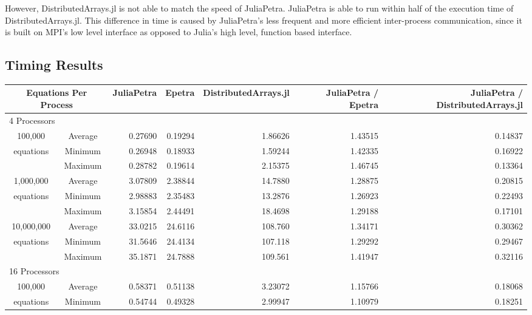 \documentclass[acmsmall]{acmart}
\begin{document}
However, DistributedArrays.jl is not able to match the speed of JuliaPetra.
JuliaPetra is able to run within half of the execution time of DistributedArrays.jl.
This difference in time is caused by JuliaPetra's less frequent and more efficient inter-process communication,
since it is built on MPI's low level interface as opposed to Julia's high level, function based interface.

\subsection{Timing Results}

\begin{table}
	\begin{tabular}{|c c|r|r|r||r|r|}
		\hline
			\multicolumn{2}{|c|}{Equations Per Process}
			& JuliaPetra
			& Epetra
			& \multicolumn{1}{m{1.8cm}||}{Distributed\-Arrays.jl}
			& \multicolumn{1}{m{1.75cm}|}{JuliaPetra / Epetra}
			& \multicolumn{1}{m{1.8cm}|}{JuliaPetra / Distributed\-Arrays.jl} \\
		\hline
			\multicolumn{7}{|l|}{4 Processors}\\
		\hline
			100,000			&Average & 0.27690 & 0.19294 & 1.86626 & 1.43515 & 0.14837 \\
			equations		&Minimum & 0.26948 & 0.18933 & 1.59244 & 1.42335 & 0.16922 \\
							&Maximum & 0.28782 & 0.19614 & 2.15375 & 1.46745 & 0.13364 \\
		\hline
			1,000,000		&Average & 3.07809 & 2.38844 & 14.7880 & 1.28875 & 0.20815 \\
			equations		&Minimum & 2.98883 & 2.35483 & 13.2876 & 1.26923 & 0.22493 \\
							&Maximum & 3.15854 & 2.44491 & 18.4698 & 1.29188 & 0.17101 \\
		\hline
			10,000,000		&Average & 33.0215 & 24.6116 & 108.760 & 1.34171 & 0.30362 \\
			equations		&Minimum & 31.5646 & 24.4134 & 107.118 & 1.29292 & 0.29467 \\
							&Maximum & 35.1871 & 24.7888 & 109.561 & 1.41947 & 0.32116 \\
		\hline
			\multicolumn{7}{|l|}{16 Processors}\\
		\hline
			100,000			&Average & 0.58371 & 0.51138 & 3.23072 & 1.15766 & 0.18068 \\
			equations		&Minimum & 0.54744 & 0.49328 & 2.99947 & 1.10979 & 0.18251 \\

\end{tabular}
\end{table}
\end{document}
